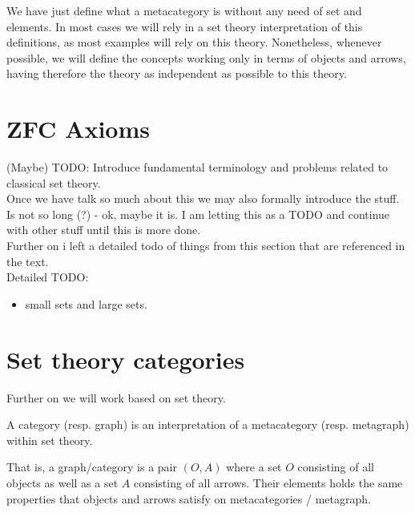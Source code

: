 We have just define what a  metacategory is without any need of set and elements. In most cases we will rely in a set theory interpretation of this definitions, as most examples will rely on this theory. Nonetheless, whenever possible, we will define the concepts working only in terms of objects and arrows, having therefore the theory as independent as possible to this theory.




\section{ZFC Axioms}
{\color{red}(Maybe) TODO}: Introduce fundamental terminology and problems related to classical set theory.\\

Once we have talk so much about this we may also formally introduce the stuff. Is not so long (?)  - ok, maybe it is. I am letting this as a TODO and continue with other stuff until this is more done.\\

Further on i left a detailed todo of things from this section that are referenced in the text.\\

Detailed TODO:
\begin{itemize}
\item small sets and large sets.
\end{itemize}


\section{Set theory categories}
Further on we will work based on set theory.

\begin{definition}
  A category (resp. graph) is an interpretation of a metacategory (resp. metagraph) within set theory.
\end{definition}


That is, a graph/category is a pair $(O,A)$ where a set $O$ consisting of all objects as well as a set $A$ consisting of all arrows. Their elements holds the same properties that objects and arrows satisfy on metacategories / metagraph.\\


